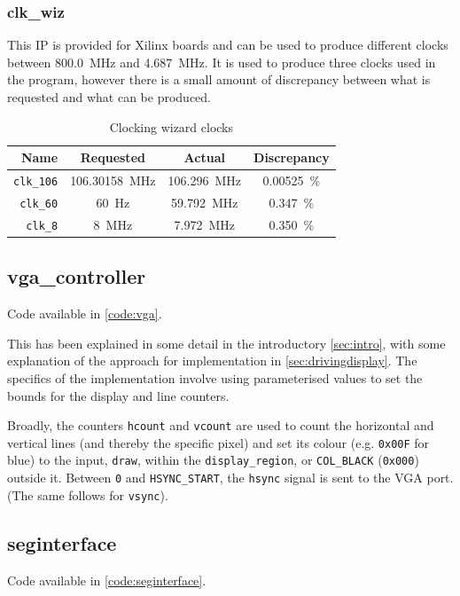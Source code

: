 \subsubsection{clk\_wiz}
This IP is provided for Xilinx boards and can be used to produce different clocks between \qty{800.0}{\MHz} and \qty{4.687}{\MHz}.
It is used to produce three clocks used in the program, however there is a small amount of discrepancy between what is requested and 
what can be produced. 

\begin{table}[H]
    \centering
\begin{tabular}{r|ccc}   
    Name & Requested & Actual & Discrepancy \\
    \hline
    \lstinline|clk_106| & \qty{106.30158}{\MHz} & \qty{106.296}{\MHz} & \qty{0.00525}{\percent} \\
    \lstinline|clk_60| & \qty{60}{\Hz} & \qty{59.792}{\MHz} & \qty{0.347}{\percent} \\
    \lstinline|clk_8| & \qty{8}{\MHz} & \qty{7.972}{\MHz} & \qty{0.350}{\percent} \\ 
\end{tabular}
    \caption{Clocking wizard clocks}
\end{table}

\subsection{vga\_controller}
Code available in \cref{code:vga}.

This has been explained in some detail in the introductory \cref{sec:intro}, with some explanation 
of the approach for implementation in \cref{sec:drivingdisplay}. The specifics of the implementation 
involve using parameterised values to set the bounds for the display and line counters. 

Broadly, the counters \lstinline|hcount| and \lstinline|vcount| are used to count the horizontal 
and vertical lines (and thereby the specific pixel) and set its colour (e.g. \lstinline|0x00F| for blue)
 to the input, \lstinline|draw|,
within the \lstinline|display_region|, or \lstinline|COL_BLACK| (\lstinline|0x000|) outside it. 
Between \lstinline|0| and \lstinline|HSYNC_START|, the \lstinline|hsync| signal is sent to the VGA port. (The same
follows for \lstinline|vsync|).

\subsection{seginterface}
Code available in \cref{code:seginterface}.

